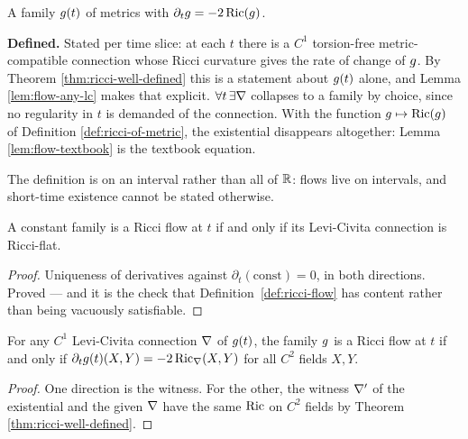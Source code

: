 \begin{definition}
  \label{def:ricci-flow}
  \leanok
  A family $g(t)$ of metrics with $\partial_t g = -2\operatorname{Ric}(g)$.

  \textbf{Defined.} Stated per time slice: at each $t$ there is a $C^1$
  torsion-free metric-compatible connection whose Ricci curvature gives the
  rate of change of $g$. By Theorem \ref{thm:ricci-well-defined} this is a
  statement about $g(t)$ alone, and Lemma \ref{lem:flow-any-lc} makes that
  explicit. $\forall t\,\exists \nabla$ collapses to a family by choice, since no
  regularity in $t$ is demanded of the connection. With the function
  $g \mapsto \operatorname{Ric}(g)$ of Definition \ref{def:ricci-of-metric}, the
  existential disappears altogether: Lemma \ref{lem:flow-textbook} is the
  textbook equation.

  The definition is on an interval rather than all of $\mathbb{R}$: flows live on
  intervals, and short-time existence cannot be stated otherwise.
\end{definition}

\begin{lemma}
  \label{lem:flow-stationary}
  \leanok
  A constant family is a Ricci flow at $t$ if and only if its Levi-Civita
  connection is Ricci-flat.
\end{lemma}

\begin{proof}
  \leanok
  Uniqueness of derivatives against $\partial_t(\text{const}) = 0$, in both
  directions. Proved --- and it is the check that
  Definition~\ref{def:ricci-flow} has content rather than being vacuously
  satisfiable.
\end{proof}

\begin{lemma}
  \label{lem:flow-any-lc}
  \leanok
  For any $C^1$ Levi-Civita connection $\nabla$ of $g(t)$, the family $g$ is a
  Ricci flow at $t$ if and only if
  $\partial_t g(t)(X, Y) = -2\operatorname{Ric}_{\nabla}(X, Y)$ for all $C^2$ fields $X, Y$.
\end{lemma}

\begin{proof}
  \leanok
  One direction is the witness. For the other, the witness $\nabla'$ of the
  existential and the given $\nabla$ have the same $\operatorname{Ric}$ on $C^2$ fields by
  Theorem \ref{thm:ricci-well-defined}.
\end{proof}

